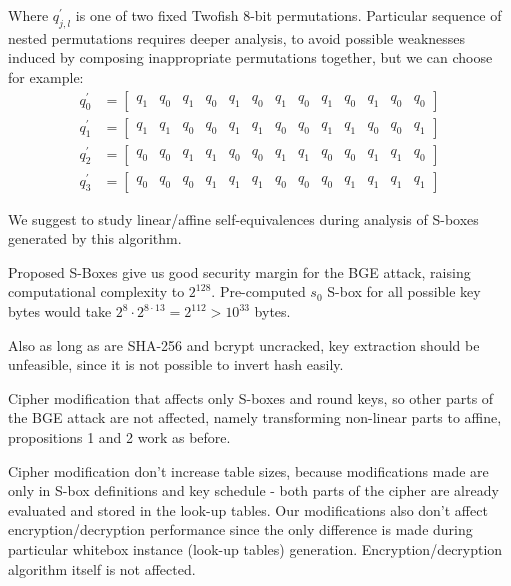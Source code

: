 \documentclass[11pt,oneside,final]{fithesis2}
\begin{document}
    Where $q^{\prime}_{j,l}$ is one of two fixed Twofish 8-bit permutations. Particular sequence of nested permutations requires deeper analysis, to avoid possible weaknesses 
    induced by composing inappropriate permutations together, but we can choose for example:
    \setcounter{MaxMatrixCols}{13}
    \begin{subequations}
    \begin{align}
	q^{\prime}_{0} &= \begin{bmatrix}  q_1 & q_0 & q_1 & q_0 & q_1 & q_0 & q_1 & q_0 & q_1 & q_0 & q_1 & q_0 & q_0 \end{bmatrix}\\
	q^{\prime}_{1} &= \begin{bmatrix}  q_1 & q_1 & q_0 & q_0 & q_1 & q_1 & q_0 & q_0 & q_1 & q_1 & q_0 & q_0 & q_1 \end{bmatrix}\\
	q^{\prime}_{2} &= \begin{bmatrix}  q_0 & q_0 & q_1 & q_1 & q_0 & q_0 & q_1 & q_1 & q_0 & q_0 & q_1 & q_1 & q_0 \end{bmatrix}\\
	q^{\prime}_{3} &= \begin{bmatrix}  q_0 & q_0 & q_0 & q_1 & q_1 & q_1 & q_0 & q_0 & q_0 & q_1 & q_1 & q_1 & q_1 \end{bmatrix}
    \end{align}
    \end{subequations}

    We suggest to study linear/affine self-equivalences \citep{Biryukov:2003:TCL:1766171.1766175} during analysis of S-boxes generated by this algorithm.

    Proposed S-Boxes give us good security margin for the BGE attack, raising computational complexity to $2^{128}$. 
    Pre-computed $s_0$ S-box for all possible key bytes would take $2^8 \cdot 2^{8\cdot13} = 2^{112} > 10^{33}$ bytes. 

    Also as long as are SHA-256 and bcrypt uncracked, key extraction should be unfeasible, since it is not possible to invert hash easily. 

    Cipher modification that affects only S-boxes and round keys, so other parts of the BGE attack are not affected, namely transforming non-linear parts
    to affine, propositions 1 and 2 work as before. 

    Cipher modification don't increase table sizes, because modifications made are only in S-box definitions and key schedule - both 
    parts of the cipher are already evaluated and stored in the look-up tables. Our modifications also don't affect encryption/decryption performance since the only
    difference is made during particular whitebox instance (look-up tables) generation. Encryption/decryption algorithm itself is not affected.
    
\end{document}

